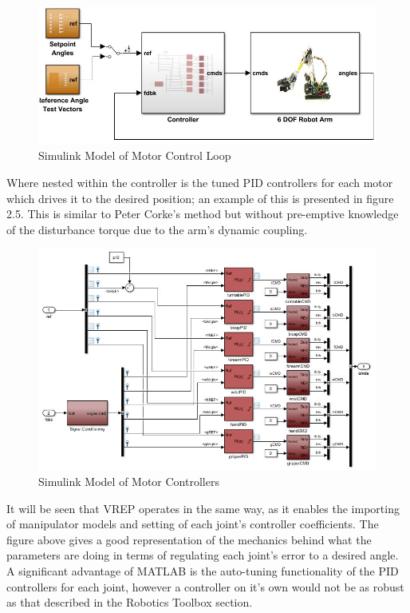 \documentclass[12pt,openany,a4paper]{book}
\begin{document}
\begin{center}
\begin{figure}[htb]
  \includegraphics[width=\linewidth]{simulink_motor_control_loop.jpg}
\caption{Simulink Model of Motor Control Loop}
\end{figure}
\end{center}

Where nested within the controller is the tuned PID controllers for each motor which drives it to the desired position; an example of this is presented in figure 2.5. This is similar to Peter Corke's method but without pre-emptive knowledge of the disturbance torque due to the arm's dynamic coupling.

\begin{center}
\begin{figure}[htb]
  \includegraphics[width=\linewidth]{simulink_motor_control_PID.jpg}
\caption{Simulink Model of Motor Controllers}
\end{figure}
\end{center}

It will be seen that VREP operates in the same way, as it enables the importing of manipulator models and setting of each joint's controller coefficients. The figure above gives a good representation of the mechanics behind what the parameters are doing in terms of regulating each joint's error to a desired angle. A significant advantage of MATLAB is the auto-tuning functionality of the PID controllers for each joint, however a controller on it's own would not be as robust as that described in the Robotics Toolbox section.
\end{document}
